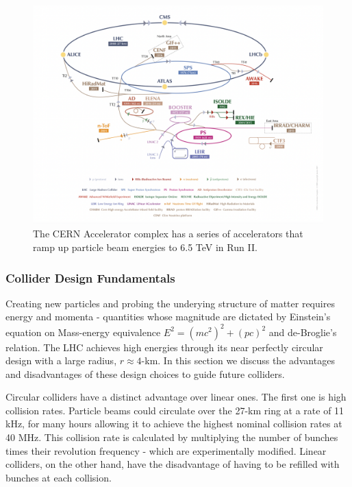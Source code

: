 \begin{figure}[!htbp]
	\centering
	\includegraphics[scale=0.5]{fig/CERNAcceleratorComplex.png}
	\caption{The CERN Accelerator complex has a series of accelerators that ramp up particle beam energies to 6.5 TeV in Run II.}
	\label{fig:accelerator_complex}
\end{figure}

\subsubsection{Collider Design Fundamentals}

Creating new particles and probing the underying structure of matter requires energy and momenta - quantities whose magnitude are dictated by Einstein's equation on Mass-energy equivalence $E^2=(mc^2)^2+(pc)^2$ and de-Broglie's relation. The LHC achieves high energies through its near perfectly circular design with a large radius, $r\approx4$-km. In this section we discuss the advantages and disadvantages of these design choices to guide  future colliders.

Circular colliders have a distinct advantage over linear ones. The first one is high collision rates. Particle beams could circulate over the 27-km ring at a rate of 11 kHz, for many hours allowing it to achieve the highest nominal collision rates at 40 MHz. This collision rate is calculated by multiplying the number of bunches times their revolution frequency - which are experimentally modified. Linear colliders, on the other hand, have the disadvantage of having to be refilled with bunches at each collision. 

